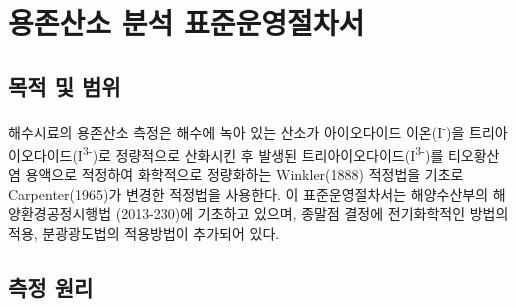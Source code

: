\documentclass[
]{book}
\begin{document}
\hypertarget{uxc6a9uxc874uxc0b0uxc18c-uxbd84uxc11d-uxd45cuxc900uxc6b4uxc601uxc808uxcc28uxc11c}{%
\chapter{용존산소 분석 표준운영절차서}\label{uxc6a9uxc874uxc0b0uxc18c-uxbd84uxc11d-uxd45cuxc900uxc6b4uxc601uxc808uxcc28uxc11c}}

\hypertarget{uxbaa9uxc801-uxbc0f-uxbc94uxc704-5}{%
\section{목적 및 범위}\label{uxbaa9uxc801-uxbc0f-uxbc94uxc704-5}}

해수시료의 용존산소 측정은 해수에 녹아 있는 산소가 아이오다이드 이온(I\textsuperscript{-})을 트리아이오다이드(I\textsuperscript{3-})로 정량적으로 산화시킨 후 발생된 트리아이오다이드(I\textsuperscript{3-})를 티오황산염 용액으로 적정하여 화학적으로 정량화하는 Winkler(1888) 적정법을 기초로 Carpenter(1965)가 변경한 적정법을 사용한다. 이 표준운영절차서는 해양수산부의 해양환경공정시행법 (2013-230)에 기초하고 있으며, 종말점 결정에 전기화학적인 방법의 적용, 분광광도법의 적용방법이 추가되어 있다.

\hypertarget{uxce21uxc815-uxc6d0uxb9ac-3}{%
\section{측정 원리}\label{uxce21uxc815-uxc6d0uxb9ac-3}}
\end{document}
